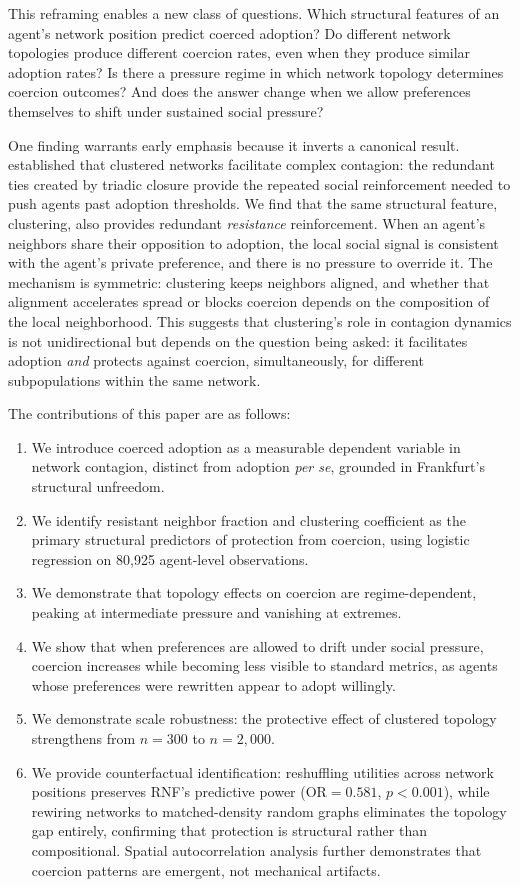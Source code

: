 \documentclass[11pt, a4paper]{article}
\newcommand{\OR}{\text{OR}}
\begin{document}
This reframing enables a new class of questions. Which structural features of an agent's network position predict coerced adoption? Do different network topologies produce different coercion rates, even when they produce similar adoption rates? Is there a pressure regime in which network topology determines coercion outcomes? And does the answer change when we allow preferences themselves to shift under sustained social pressure?

One finding warrants early emphasis because it inverts a canonical result. \citet{centola2007complex, centola2010spread} established that clustered networks facilitate complex contagion: the redundant ties created by triadic closure provide the repeated social reinforcement needed to push agents past adoption thresholds. We find that the same structural feature, clustering, also provides redundant \textit{resistance} reinforcement. When an agent's neighbors share their opposition to adoption, the local social signal is consistent with the agent's private preference, and there is no pressure to override it. The mechanism is symmetric: clustering keeps neighbors aligned, and whether that alignment accelerates spread or blocks coercion depends on the composition of the local neighborhood. This suggests that clustering's role in contagion dynamics is not unidirectional but depends on the question being asked: it facilitates adoption \textit{and} protects against coercion, simultaneously, for different subpopulations within the same network.

The contributions of this paper are as follows:

\begin{enumerate}
    \item We introduce coerced adoption as a measurable dependent variable in network contagion, distinct from adoption \textit{per se}, grounded in Frankfurt's structural unfreedom.
    \item We identify resistant neighbor fraction and clustering coefficient as the primary structural predictors of protection from coercion, using logistic regression on 80{,}925 agent-level observations.
    \item We demonstrate that topology effects on coercion are regime-dependent, peaking at intermediate pressure and vanishing at extremes.
    \item We show that when preferences are allowed to drift under social pressure, coercion increases while becoming less visible to standard metrics, as agents whose preferences were rewritten appear to adopt willingly.
    \item We demonstrate scale robustness: the protective effect of clustered topology strengthens from $n = 300$ to $n = 2{,}000$.
    \item We provide counterfactual identification: reshuffling utilities across network positions preserves RNF's predictive power ($\OR = 0.581$, $p < 0.001$), while rewiring networks to matched-density random graphs eliminates the topology gap entirely, confirming that protection is structural rather than compositional. Spatial autocorrelation analysis further demonstrates that coercion patterns are emergent, not mechanical artifacts.
\end{enumerate}
\end{document}
